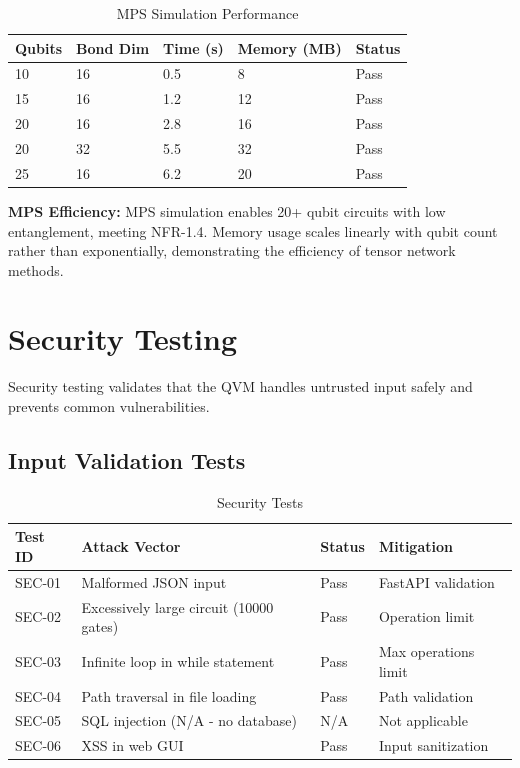 \begin{table}[h]
\centering
\caption{MPS Simulation Performance}
\begin{tabular}{|p{2cm}|p{2.5cm}|p{2.5cm}|p{2.5cm}|p{2.5cm}|}
\hline
\textbf{Qubits} & \textbf{Bond Dim} & \textbf{Time (s)} & \textbf{Memory (MB)} & \textbf{Status} \\
\hline
10 & 16 & 0.5 & 8 & Pass \\
\hline
15 & 16 & 1.2 & 12 & Pass \\
\hline
20 & 16 & 2.8 & 16 & Pass \\
\hline
20 & 32 & 5.5 & 32 & Pass \\
\hline
25 & 16 & 6.2 & 20 & Pass \\
\hline
\end{tabular}
\end{table}

\textbf{MPS Efficiency:} MPS simulation enables 20+ qubit circuits with low entanglement, meeting NFR-1.4. Memory usage scales linearly with qubit count rather than exponentially, demonstrating the efficiency of tensor network methods.

\section{Security Testing}
Security testing validates that the QVM handles untrusted input safely and prevents common vulnerabilities.

\subsection{Input Validation Tests}

\begin{table}[h]
\centering
\caption{Security Tests}
\begin{tabular}{|p{2cm}|p{5.5cm}|p{2cm}|p{2.5cm}|}
\hline
\textbf{Test ID} & \textbf{Attack Vector} & \textbf{Status} & \textbf{Mitigation} \\
\hline
SEC-01 & Malformed JSON input & Pass & FastAPI validation \\
\hline
SEC-02 & Excessively large circuit (10000 gates) & Pass & Operation limit \\
\hline
SEC-03 & Infinite loop in while statement & Pass & Max operations limit \\
\hline
SEC-04 & Path traversal in file loading & Pass & Path validation \\
\hline
SEC-05 & SQL injection (N/A - no database) & N/A & Not applicable \\
\hline
SEC-06 & XSS in web GUI & Pass & Input sanitization \\
\hline
\end{tabular}
\end{table}

